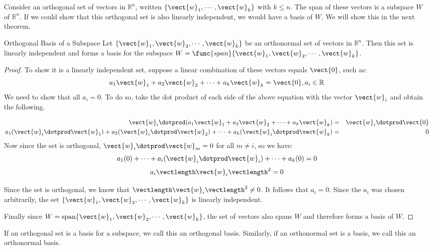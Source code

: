 Consider an orthogonal set of vectors in $\mathbb{R}^n$, written $\{
\vect{w}_1, \cdots, \vect{w}_k \}$ with $k \leq n$. The span of these
vectors is a subspace $W$ of $\mathbb{R}^n$. If we
could show that this orthogonal set is also linearly independent, we
would have a basis of $W$. We will show this in the next theorem.

\begin{theorem}{Orthogonal Basis of a Subspace}\label{thm:orthbasis}
Let $ \{ \vect{w}_1, \vect{w}_2, \cdots, \vect{w}_k \}$ be an
orthonormal set of vectors in $\mathbb{R}^n$. Then this set is
linearly independent and forms a basis for the subspace $W =
\func{span} \{ \vect{w}_1, \vect{w}_2, \cdots, \vect{w}_k \}$.
\end{theorem}

\begin{proof}
To show it is a linearly independent set, suppose a linear combination
of these vectors equals $\vect{0}$, such as:
\[
a_1 \vect{w}_1 + a_2 \vect{w}_2 + \cdots + a_k \vect{w}_k = \vect{0}, a_i \in \mathbb{R} 
\]
We need to show that all $a_i = 0$. To do so, take the dot product of
each side of the above equation with the vector $\vect{w}_i$ and obtain the following. 

\begin{eqnarray*}
\vect{w}_i \dotprod (a_1 \vect{w}_1 + a_2 \vect{w}_2 + \cdots + a_k \vect{w}_k ) &=& \vect{w}_i \dotprod \vect{0}\\
a_1 (\vect{w}_i \dotprod \vect{w}_1) + a_2 (\vect{w}_i \dotprod \vect{w}_2) + \cdots + a_k (\vect{w}_i \dotprod \vect{w}_k)  &=& 0 
\end{eqnarray*}
Now since the set is orthogonal, $\vect{w}_i \dotprod \vect{w}_m = 0$ for all $m \neq i$, so we have:
\[
a_1 (0) + \cdots + a_i(\vect{w}_i \dotprod \vect{w}_i) + \cdots + a_k (0) = 0
\]
\[
a_i \vectlength \vect{w}_i \vectlength^2 = 0
\]

Since the set is orthogonal, we know that $\vectlength \vect{w}_i \vectlength^2  \neq 0$. It follows that $a_i =0$. Since the $a_i$ was chosen arbitrarily, the set $\{ \vect{w}_1, \vect{w}_2, \cdots, \vect{w}_k \}$ is linearly independent. 

Finally since $W = \mbox{span} \{ \vect{w}_1, \vect{w}_2, \cdots,
\vect{w}_k \}$, the set of vectors also spans $W$ and therefore forms a basis of $W$. 

\end{proof}

If an orthogonal set is a basis for a subspace, we call this an
orthogonal basis. Similarly, if an orthonormal set is a basis, we call
this an orthonormal basis.

